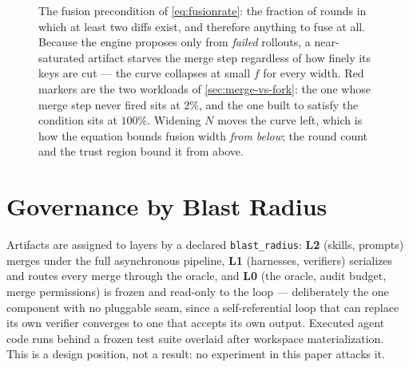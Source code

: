 \documentclass{article}
\newcommand{\code}[1]{\texttt{#1}}
\begin{document}
\begin{figure}[t]
\centering
{}
\caption{The fusion precondition of \cref{eq:fusionrate}: the fraction of rounds in which at least two diffs exist, and therefore anything to fuse at all. Because the engine proposes only from \emph{failed} rollouts, a near-saturated artifact starves the merge step regardless of how finely its keys are cut --- the curve collapses at small $f$ for every width. Red markers are the two workloads of \cref{sec:merge-vs-fork}: the one whose merge step never fired sits at $2\%$, and the one built to satisfy the condition sits at $100\%$. Widening $N$ moves the curve left, which is how the equation bounds fusion width \emph{from below}; the round count and the trust region bound it from above.}
\label{fig:fusionrate}
\end{figure}

\section{Governance by Blast Radius}
\label{sec:governance}

Artifacts are assigned to layers by a declared \code{blast\_radius}: \textbf{L2} (skills, prompts) merges under the full asynchronous pipeline, \textbf{L1} (harnesses, verifiers) serializes and routes every merge through the oracle, and \textbf{L0} (the oracle, audit budget, merge permissions) is frozen and read-only to the loop --- deliberately the one component with no pluggable seam, since a self-referential loop that can replace its own verifier converges to one that accepts its own output. Executed agent code runs behind a frozen test suite overlaid after workspace materialization. This is a design position, not a result: no experiment in this paper attacks it.
\end{document}
